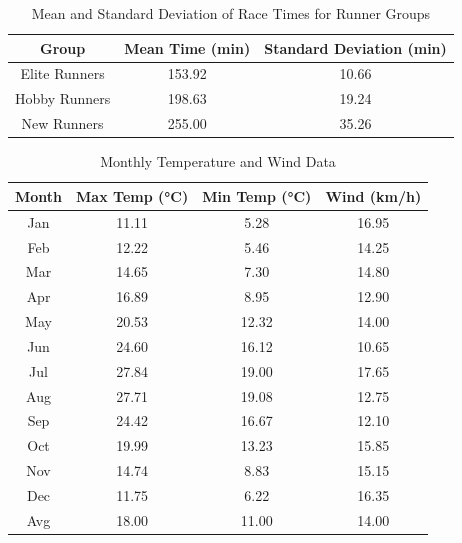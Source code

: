 \documentclass[conference]{IEEEtran}
\begin{document}
\begin{table}[htbp]
\caption{Mean and Standard Deviation of Race Times for Runner Groups}
\begin{center}
\begin{tabular}{|c|c|c|}
\hline
\textbf{Group} & \textbf{Mean Time (min)} & \textbf{Standard Deviation (min)} \\
\hline
Elite Runners & 153.92 & 10.66 \\
\hline
Hobby Runners & 198.63 & 19.24 \\
\hline
New Runners & 255.00 & 35.26 \\
\hline
\end{tabular}
\label{tab:elite_hobby_new_mean_std_dev}
\end{center}
\end{table}

\begin{table}[htbp]
\caption{Monthly Temperature and Wind Data}
\begin{center}
\begin{tabular}{|c|c|c|c|}
\hline
\textbf{Month} & \textbf{Max Temp (°C)} & \textbf{Min Temp (°C)} & \textbf{Wind (km/h)} \\
\hline
Jan & 11.11 & 5.28 & 16.95 \\
\hline
Feb & 12.22 & 5.46 & 14.25 \\
\hline
Mar & 14.65 & 7.30 & 14.80 \\
\hline
Apr & 16.89 & 8.95 & 12.90 \\
\hline
May & 20.53 & 12.32 & 14.00 \\
\hline
Jun & 24.60 & 16.12 & 10.65 \\
\hline
Jul & 27.84 & 19.00 & 17.65 \\
\hline
Aug & 27.71 & 19.08 & 12.75 \\
\hline
Sep & 24.42 & 16.67 & 12.10 \\
\hline
Oct & 19.99 & 13.23 & 15.85 \\
\hline
Nov & 14.74 & 8.83 & 15.15 \\
\hline
Dec & 11.75 & 6.22 & 16.35 \\
\hline
Avg & 18.00 & 11.00 & 14.00 \\
\hline
\end{tabular}
\label{tab:monthly_temp_wind}
\end{center}
\end{table}
\end{document}
